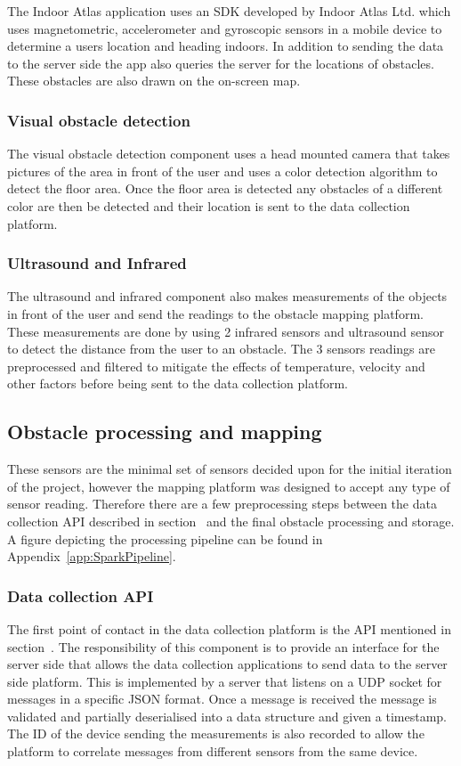 \documentclass[prodmode,acmtosem]{acmsmall} %
\begin{document}
The Indoor Atlas application uses an SDK developed by Indoor Atlas Ltd. \cite{IndoorAtlas} which uses magnetometric, accelerometer and gyroscopic sensors in a mobile device to determine a users location and heading indoors. In addition to sending the data to the server side the app also queries the server for the locations of obstacles. These obstacles are also drawn on the on-screen map.

\subsubsection{Visual obstacle detection}
The visual obstacle detection component uses a head mounted camera that takes pictures of the area in front of the user and uses a color detection algorithm to detect the floor area. Once the floor area is detected any obstacles of a different color are then be detected and their location is sent to the data collection platform.

\subsubsection{Ultrasound and Infrared}
The ultrasound and infrared component also makes measurements of the objects in front of the user and send the readings to the obstacle mapping platform.
These measurements are done by using 2 infrared sensors and ultrasound sensor to detect the distance from the user to an obstacle. The 3 sensors readings are preprocessed and filtered to mitigate the effects of temperature, velocity and other factors before being sent to the data collection platform. 

\subsection{Obstacle processing and mapping}
These sensors are the minimal set of sensors decided upon for the initial iteration of the project, however the mapping platform was designed to accept any type of sensor reading. Therefore there are a few preprocessing steps between the data collection API described in section~\cite{sec:interactions} and the final obstacle processing and storage. A figure depicting the processing pipeline can be found in Appendix~\ref{app:SparkPipeline}.

\subsubsection{Data collection API}
The first point of contact in the data collection platform is the API mentioned in section~\cite{sec:interactions}. The responsibility of this component is to provide an interface for the server side that allows the data collection applications to send data to the server side platform. This is implemented by a server that listens on a UDP socket for messages in a specific JSON format. Once a message is received the message is validated and partially deserialised into a data structure and given a timestamp. The ID of the device sending the measurements is also recorded to allow the platform to correlate messages from different sensors from the same device.
\end{document}
